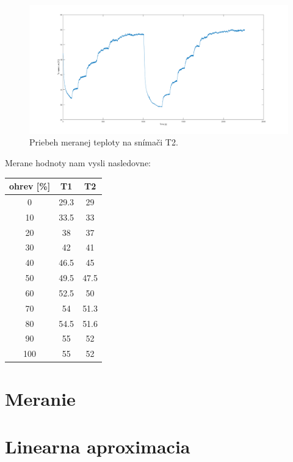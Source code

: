 \documentclass{article}
\begin{document}
\begin{figure}[!htbp]
	\begin{center}
		\includegraphics[width=\textwidth]{./include/teplota.png}
		\caption{Priebeh meranej teploty na snímači T2.}
		\label{fig:mt2}
	\end{center}
	\hfill
\end{figure}

Merane hodnoty nam vysli nasledovne:

\begin{center}
\begin{tabular}{ |c|c|c| }
 \hline
 ohrev [\%] & T1 & T2 \\
 \hline
   0 & 29.3 & 29 \\
  10 & 33.5 & 33 \\
  20 & 38 & 37 \\
  30 & 42 & 41\\
  40 & 46.5 & 45\\
  50 & 49.5 & 47.5\\
  60 & 52.5 & 50 \\
  70 & 54 & 51.3 \\
  80 & 54.5 & 51.6 \\
  90 & 55 & 52 \\
 100 & 55 & 52 \\
 \hline
\end{tabular}
\end{center}
\newpage

\section{Meranie}
\label{sec:meranie}

\clearpage

\section{Linearna aproximacia}
\label{sec:lin}
\end{document}
